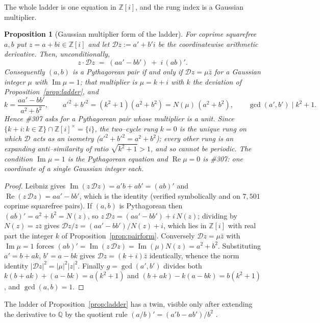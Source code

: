 \documentclass[11pt]{article}
\newtheorem{proposition}[theorem]{Proposition}
\theoremstyle{definition}
\begin{document}
The whole ladder is one equation in $\mathbb{Z}[i]$, and the rung index is a Gaussian multiplier.

\begin{proposition}[Gaussian multiplier form of the ladder]\label{prop:multiplier}
For coprime squarefree $a,b$ put $z=a+bi\in\mathbb{Z}[i]$ and let $\mathcal{D}z:=a'+b'i$ be the
coordinatewise arithmetic derivative. Then, unconditionally,
\[ z\cdot\mathcal{D}z\;=\;(aa'-bb')\;+\;i\,(ab)'. \]
Consequently $(a,b)$ is a Pythagorean pair if and only if $\mathcal{D}z=\mu\bar z$ for a Gaussian
integer $\mu$ with $\operatorname{Im}\mu=1$; that multiplier is $\mu=k+i$ with $k$ the deviation of
Proposition~\ref{prop:ladder}, and
\[ k=\frac{aa'-bb'}{a^2+b^2},\qquad
   a'^2+b'^2=(k^2+1)(a^2+b^2)=N(\mu)\,(a^2+b^2),\qquad \gcd(a',b')\mid k^2+1. \]
Hence \#307 asks for a Pythagorean pair whose multiplier is a \emph{unit}. Since
$\{k+i:k\in\mathbb{Z}\}\cap\mathbb{Z}[i]^{\times}=\{i\}$, the two--cycle rung $k=0$ is the unique rung
on which $\mathcal{D}$ acts as an isometry ($a'^2+b'^2=a^2+b^2$); every other rung is an expanding
anti--similarity of ratio $\sqrt{k^2+1}>1$, and so cannot be periodic. The condition
$\operatorname{Im}\mu=1$ is the Pythagorean equation and $\operatorname{Re}\mu=0$ is \#307: one
coordinate of a single Gaussian integer each.
\end{proposition}
\begin{proof}
Leibniz gives $\operatorname{Im}(z\,\mathcal{D}z)=a'b+ab'=(ab)'$ and
$\operatorname{Re}(z\,\mathcal{D}z)=aa'-bb'$, which is the identity (verified symbolically and on
$7{,}501$ coprime squarefree pairs). If $(a,b)$ is Pythagorean then $(ab)'=a^2+b^2=N(z)$, so
$z\,\mathcal{D}z=(aa'-bb')+i\,N(z)$; dividing by $N(z)=z\bar z$ gives
$\mathcal{D}z/\bar z=(aa'-bb')/N(z)+i$, which lies in $\mathbb{Z}[i]$ with real part the integer $k$ of
Proposition~\ref{prop:pairform}. Conversely $\mathcal{D}z=\mu\bar z$ with $\operatorname{Im}\mu=1$
forces $(ab)'=\operatorname{Im}(z\,\mathcal{D}z)=\operatorname{Im}(\mu)N(z)=a^2+b^2$. Substituting
$a'=b+ak$, $b'=a-bk$ gives $\mathcal{D}z=(k+i)\bar z$ identically, whence the norm identity
$|\mathcal{D}z|^2=|\mu|^2|z|^2$. Finally $g=\gcd(a',b')$ divides both
$k(b+ak)+(a-bk)=a(k^2+1)$ and $(b+ak)-k(a-bk)=b(k^2+1)$, and $\gcd(a,b)=1$.
\end{proof}

The ladder of Proposition~\ref{prop:ladder} has a twin, visible only after extending the derivative
to $\mathbb{Q}$ by the quotient rule $(a/b)'=(a'b-ab')/b^2$ \cite{UfnarovskiAhlander2003}.
\end{document}
